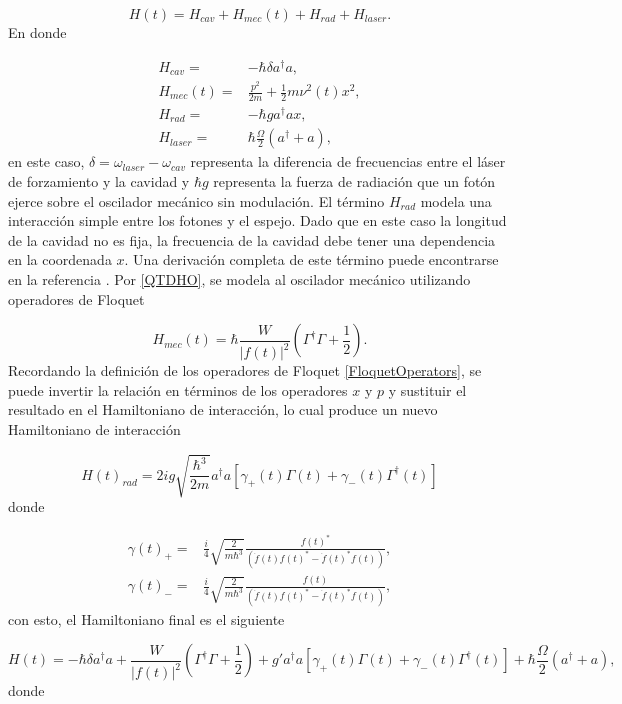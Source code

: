\documentclass[10pt,a4paper]{report}
\begin{document}
\begin{equation}
H(t) = H_{cav} + H_{mec}(t) + H_{rad} + H_{laser}.
\end{equation} En donde

\begin{align}
H_{cav} =& -\hbar \delta a^\dagger a,\\
H_{mec}(t) =& \frac{p^2}{2m} + \frac{1}{2}m \nu^2 (t) x^2,\\
H_{rad} =& -\hbar g a^\dagger a x,\\
H_{laser} =& \hbar\frac{\Omega}{2}(a^\dagger + a),
\end{align} en este caso, $\delta = \omega_{laser} - \omega_{cav}$ representa la diferencia de frecuencias entre el láser de forzamiento y la cavidad y $\hbar g$ representa la fuerza de radiación que un fotón ejerce sobre el oscilador mecánico sin modulación. El término $H_{rad}$ modela una interacción simple entre los fotones y el espejo. Dado que en este caso la longitud de la cavidad no es fija, la frecuencia de la cavidad debe tener una dependencia en la coordenada $x$. Una derivación completa de este término puede encontrarse en la referencia \cite{KippenberCO}. Por \eqref{QTDHO}, se modela al oscilador mecánico utilizando operadores de Floquet

\begin{equation}
H_{mec}(t) = \hbar\frac{W}{|f(t)|^2}(\Gamma^\dagger \Gamma + \frac{1}{2}).
\end{equation} Recordando la definición de los operadores de Floquet \eqref{FloquetOperators}, se puede invertir la relación en términos de los operadores $x$ y $p$ y sustituir el resultado en el Hamiltoniano de interacción, lo cual produce un nuevo Hamiltoniano de interacción\cite{TesisMaestria}

\begin{equation}
H(t)_{rad} = 2ig\sqrt{\frac{\hbar^3}{2m}}  a^\dagger a[\gamma_+(t)\Gamma (t) +\gamma_-(t)\Gamma^\dagger (t)]
\end{equation} donde

\begin{align}
\gamma(t)_+ =& \frac{i}{4}\sqrt{\frac{2}{m\hbar^3}} \frac{f(t)^*}{(\dot{f}(t)f(t)^*-\dot{f}(t)^*f(t))},\\
\gamma(t)_- =& \frac{i}{4}\sqrt{\frac{2}{m\hbar^3}} \frac{f(t)}{(\dot{f}(t)f(t)^*-\dot{f}(t)^*f(t))},
\end{align} con esto, el Hamiltoniano final es el siguiente

\begin{equation}\label{LaserCoolingHamiltonian}
H(t) = -\hbar \delta a^\dagger a + \frac{W}{|f(t)|^2}(\Gamma^\dagger \Gamma + \frac{1}{2}) +  g'a^\dagger a[\gamma_+(t)\Gamma (t) +\gamma_-(t)\Gamma^\dagger (t)] + \hbar\frac{\Omega}{2}(a^\dagger + a),
\end{equation} donde 
\end{document}
